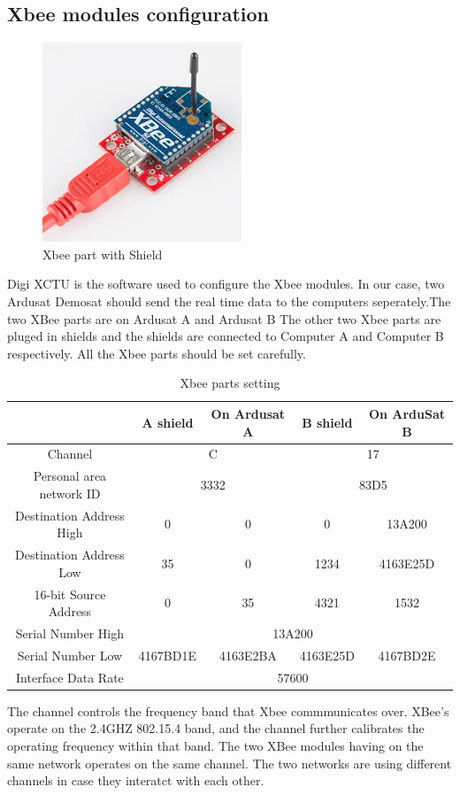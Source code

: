 \subsection{Xbee modules configuration}
\begin{figure}[!h]
\centering
\includegraphics{fig/DOE/XbeeShield}
\caption{Xbee part with Shield}
\end{figure}
Digi XCTU\cite{https://www.digi.com/products/xbee-rf-solutions/xctu-software/xctu} is the software used to configure the Xbee modules. In our case, two Ardusat Demosat should send the real time data to the computers seperately.The two XBee parts are on Ardusat A and Ardusat B The other two Xbee parts are pluged in shields and the shields are connected to Computer A and Computer B respectively. All the Xbee parts should be set carefully\cite{https://learn.sparkfun.com/tutorials/exploring-xbees-and-xctu/configuring-networks}. 
\begin{table}[!h]
\renewcommand\arraystretch{2}
	\begin{center}
	\caption{Xbee parts setting}
	\begin{tabular}{|c|c|c|c|c|}
	\hline
	\backslashbox{\textbf{Setting}}{\textbf{Xbee part}} & \textbf{A shield} & \textbf{On Ardusat A} & \textbf{B shield} & \textbf{On ArduSat B}\\ \hline
	Channel & \multicolumn{2}{c|}{C} &\multicolumn{2}{c|}{17}  \\ \hline
	Personal area network ID & \multicolumn{2}{c|}{3332}& \multicolumn{2}{c|}{83D5}\\ \hline
	Destination Address High & 0 & 0 & 0 & 13A200\\ \hline
	Destination Address Low & 35 & 0 & 1234&4163E25D\\ \hline
	16-bit Source Address & 0 & 35 & 4321 & 1532\\ \hline
	Serial Number High & \multicolumn{4}{c|}{13A200}\\ \hline
	Serial Number Low & 4167BD1E & 4163E2BA & 4163E25D & 4167BD2E\\ \hline
	Interface Data Rate	 & \multicolumn{4}{c|}{57600}\\ \hline
	\end{tabular}	
	\end{center}
\end{table}
The channel controls the frequency band that Xbee commmunicates over. XBee's operate on the 2.4GHZ 802.15.4 band, and the channel further calibrates the operating frequency within that band. The two XBee modules having on the same network operates on the same channel. The two networks are using different channels in case they interatct with each other.

